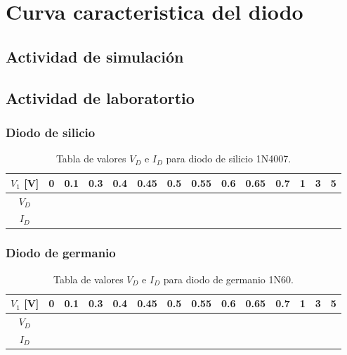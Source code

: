 \documentclass[chaptersright]{informeutn}
\begin{document}
\chapter{Curva caracteristica del diodo}

  \section{Actividad de simulación}
  
  \section{Actividad de laboratortio}
  
    \subsection{Diodo de silicio}
    
      \begin{table}[h!]
      \centering
      \renewcommand{\arraystretch}{1.5}
      \setlength{\tabcolsep}{8pt}
      \begin{tabular}{|c|*{13}{c|}}
      \hline
      \textbf{$V_1$ [V]} & 0 & 0.1 & 0.3 & 0.4 & \cellcolor{yellow}0.45 & \cellcolor{yellow}0.5 & \cellcolor{yellow}0.55 & \cellcolor{yellow}0.6 & \cellcolor{yellow}0.65 & \cellcolor{yellow}0.7 & 1 & 3 & 5 \\
      \hline
      $V_D$ &  &  &  &  &  &  &  &  &  &  &  &  &  \\
      \hline
      $I_D$ &  &  &  &  &  &  &  &  &  &  &  &  &  \\
      \hline
      \end{tabular}
      \caption{Tabla de valores $V_D$ e $I_D$ para diodo de silicio 1N4007.}
      \label{a}
      \end{table}
    
    \subsection{Diodo de germanio}
    
      \begin{table}[h!]
      \centering
      \renewcommand{\arraystretch}{1.5}
      \setlength{\tabcolsep}{8pt}
      \begin{tabular}{|c|*{13}{c|}}
      \hline
      \textbf{$V_1$ [V]} & 0 & 0.1 & 0.3 & 0.4 & \cellcolor{yellow}0.45 & \cellcolor{yellow}0.5 & \cellcolor{yellow}0.55 & \cellcolor{yellow}0.6 & \cellcolor{yellow}0.65 & \cellcolor{yellow}0.7 & 1 & 3 & 5 \\
      \hline
      $V_D$ &  &  &  &  &  &  &  &  &  &  &  &  &  \\
      \hline
      $I_D$ &  &  &  &  &  &  &  &  &  &  &  &  &  \\
      \hline
      \end{tabular}
      \caption{Tabla de valores $V_D$ e $I_D$ para diodo de germanio 1N60.}
      \label{b}
      \end{table}
\end{document}
